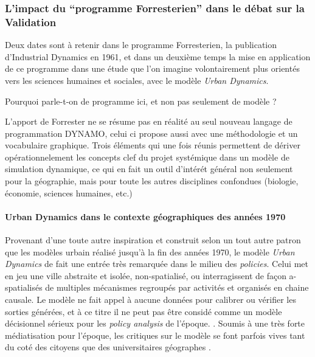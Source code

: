 \subsubsection{L'impact du \enquote{programme Forresterien} dans le débat sur la Validation}

Deux dates sont à retenir dans le programme Forresterien, la publication d'Industrial Dynamics en 1961, et dans un deuxième temps la mise en application de ce programme dans une étude que l'on imagine volontairement plus orientés vers les sciences humaines et sociales, avec le modèle \textit{Urban Dynamics}.

Pourquoi parle-t-on de programme ici, et non pas seulement de modèle ? 

L'apport de Forrester ne se résume pas en réalité au seul nouveau langage de programmation DYNAMO, celui ci propose aussi avec une méthodologie et un vocabulaire graphique. Trois éléments qui une fois réunis permettent de dériver opérationnelement les concepts clef du projet systémique dans un modèle de simulation dynamique, ce qui en fait un outil d'intérét général non seulement pour la géographie, mais pour toute les autres disciplines confondues (biologie, économie, sciences humaines, etc.) \autocite{Rosnay1975}

\paragraph{Urban Dynamics dans le contexte géographiques des années 1970}

Provenant d'une toute autre inspiration et construit selon un tout autre patron que les modèles urbain réalisé jusqu'à la fin des années 1970, le modèle \textit{Urban Dynamics} de \textcite{Forrester1969} fait une entrée très remarquée dans le milieu des \textit{policies}. Celui met en jeu une ville abstraite et isolée, non-spatialisé, ou interragissent de façon a-spatialisés de multiples mécanismes regroupés par activités et organisés en chaine causale. Le modèle ne fait appel à aucune données pour calibrer ou vérifier les sorties générées, et à ce titre il ne peut pas être considé comme un modèle décisionnel sérieux pour les \textit{policy analysis} de l'époque. \autocite{Lee1973}. Soumis à une très forte médiatisation pour l'époque, les critiques sur le modèle se font parfois vives tant du coté des citoyens \autocite{Forrester1989, Forrester2007} que des universitaires géographes \autocite{Tobler1970a, Berry1970, Batty1971}.

